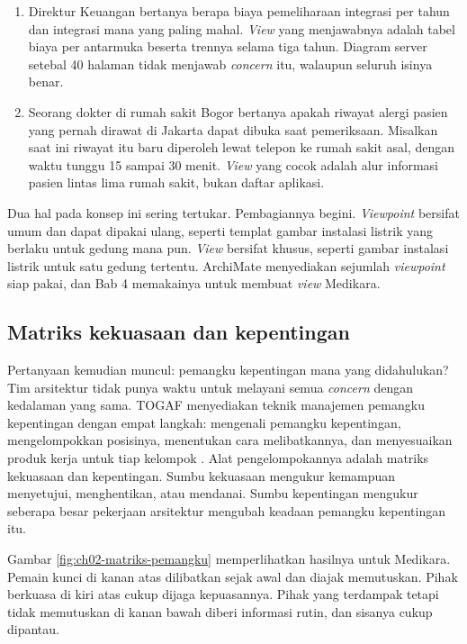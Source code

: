 \begin{enumerate}
  \item Direktur Keuangan bertanya berapa biaya pemeliharaan integrasi per
        tahun dan integrasi mana yang paling mahal. \textit{View} yang
        menjawabnya adalah tabel biaya per antarmuka beserta trennya selama
        tiga tahun. Diagram server setebal 40 halaman tidak menjawab
        \textit{concern} itu, walaupun seluruh isinya benar.
  \item Seorang dokter di rumah sakit Bogor bertanya apakah riwayat alergi
        pasien yang pernah dirawat di Jakarta dapat dibuka saat pemeriksaan.
        Misalkan saat ini riwayat itu baru diperoleh lewat telepon ke rumah
        sakit asal, dengan waktu tunggu 15 sampai 30 menit. \textit{View}
        yang cocok adalah alur informasi pasien lintas lima rumah sakit,
        bukan daftar aplikasi.
\end{enumerate}

Dua hal pada konsep ini sering tertukar. Pembagiannya begini.
\textit{Viewpoint} bersifat umum dan dapat dipakai ulang, seperti templat
gambar instalasi listrik yang berlaku untuk gedung mana pun. \textit{View}
bersifat khusus, seperti gambar instalasi listrik untuk satu gedung tertentu.
ArchiMate menyediakan sejumlah \textit{viewpoint} siap pakai, dan Bab 4
memakainya untuk membuat \textit{view} Medikara.

\subsection*{Matriks kekuasaan dan kepentingan}

Pertanyaan kemudian muncul: pemangku kepentingan mana yang didahulukan? Tim
arsitektur tidak punya waktu untuk melayani semua \textit{concern} dengan
kedalaman yang sama. TOGAF menyediakan teknik manajemen pemangku kepentingan
dengan empat langkah: mengenali pemangku kepentingan, mengelompokkan
posisinya, menentukan cara melibatkannya, dan menyesuaikan produk kerja
untuk tiap kelompok \cite{c02-togaf-pocket}. Alat pengelompokannya adalah
matriks kekuasaan dan kepentingan. Sumbu kekuasaan mengukur kemampuan
menyetujui, menghentikan, atau mendanai. Sumbu kepentingan mengukur seberapa
besar pekerjaan arsitektur mengubah keadaan pemangku kepentingan itu.

Gambar \ref{fig:ch02-matriks-pemangku} memperlihatkan hasilnya untuk
Medikara. Pemain kunci di kanan atas dilibatkan sejak awal dan diajak
memutuskan. Pihak berkuasa di kiri atas cukup dijaga kepuasannya. Pihak yang
terdampak tetapi tidak memutuskan di kanan bawah diberi informasi rutin, dan
sisanya cukup dipantau.

